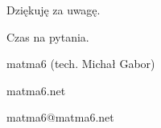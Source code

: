 \documentclass[blue]{beamer}
\begin{document}
\begin{frame}
\begin{center}
\begin{Huge}
Dziękuję za uwagę.

Czas na pytania.

matma6 (tech. Michał Gabor)

matma6.net

matma6@matma6.net

\end{Huge}
\end{center}
\end{frame}
\end{document}
